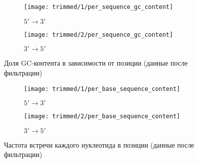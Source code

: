 \documentclass[main.tex]{subfiles}
\begin{document}
\begin{figure}[H]
    \centering
    \begin{subfigure}{.5\textwidth}
        \centering
        \texttt{[image: trimmed/1/per\_sequence\_gc\_content]}
        \caption{$ 5' \to 3' $}
    \end{subfigure}%
    \begin{subfigure}{.5\textwidth}
        \centering
        \texttt{[image: trimmed/2/per\_sequence\_gc\_content]}
        \caption{$ 3' \to 5' $}
    \end{subfigure}
    \caption{Доля GC-контента в зависимости от позиции (данные после фильтрации)}
    \label{fig:trimmed:gc}
\end{figure}

\begin{figure}[H]
    \centering
    \begin{subfigure}{.5\textwidth}
        \centering
        \texttt{[image: trimmed/1/per\_base\_sequence\_content]}
        \caption{$ 5' \to 3' $}
    \end{subfigure}%
    \begin{subfigure}{.5\textwidth}
        \centering
        \texttt{[image: trimmed/2/per\_base\_sequence\_content]}
        \caption{$ 3' \to 5' $}
    \end{subfigure}
    \caption{Частота встречи каждого нуклеотида в позиции (данные после фильтрации)}
    \label{fig:trimmed:sequence_content}
\end{figure}
\end{document}
